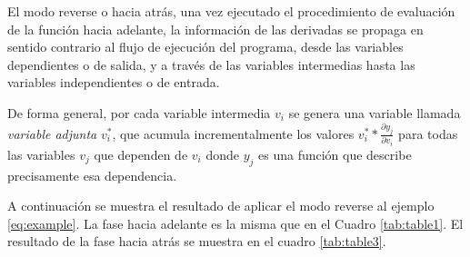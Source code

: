 El modo reverse o hacia atrás, una vez ejecutado el procedimiento de evaluación de la función hacia adelante, la información de las derivadas se propaga en sentido contrario al flujo de ejecución del programa, desde las variables dependientes o de salida, y a través de las variables intermedias hasta las variables independientes o de entrada.

De forma general, por cada variable intermedia $v_{i}$ se genera una variable llamada \textit{variable adjunta} $v^{*}_{i}$, que acumula incrementalmente los valores $v^{*}_{i}* \frac{\partial{y_{j}}}{\partial{v_{i}}}$ para todas las variables $v_{j}$ que dependen de $v_{i}$ donde $y_{j}$ es una función que describe precisamente esa dependencia.

A continuación se muestra el resultado de aplicar el modo reverse al ejemplo \ref{eq:example}. La fase hacia adelante es la misma que en el Cuadro \ref{tab:table1}. El resultado de la fase hacia atrás se muestra en el cuadro \ref{tab:table3}.


